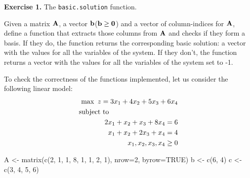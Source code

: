 \documentclass[
]{article}
\newenvironment{Shaded}{\begin{snugshade}}{\end{snugshade}}
\newcommand{\AttributeTok}[1]{\textcolor[rgb]{0.77,0.63,0.00}{#1}}
\newcommand{\ConstantTok}[1]{\textcolor[rgb]{0.00,0.00,0.00}{#1}}
\newcommand{\DecValTok}[1]{\textcolor[rgb]{0.00,0.00,0.81}{#1}}
\newcommand{\FunctionTok}[1]{\textcolor[rgb]{0.00,0.00,0.00}{#1}}
\newcommand{\NormalTok}[1]{#1}
\newcommand{\OtherTok}[1]{\textcolor[rgb]{0.56,0.35,0.01}{#1}}
\begin{document}
\textbf{Exercise 1.} The \texttt{basic.solution} function.

Given a matrix \({\bf A}\), a vector
\({\bf b}\)(\({\bf b}\geq {\bf 0}\)) and a vector of column-indices for
\({\bf A}\), define a function that extracts those columns from
\({\bf A}\) and checks if they form a basis. If they do, the function
returns the corresponding basic solution: a vector with the values for
all the variables of the system. If they don't, the function returns a
vector with the values for all the variables of the system set to -1.

To check the correctness of the functions implemented, let us consider
the following linear model: \vspace{-0.5cm} \begin{eqnarray*}
\max\ z=3x_{1}+4x_{2}+5x_3+6x_4 \\
\mbox{subject to}\hspace{3.5cm}\\
2x_{1}+x_{2}+x_3+8x_4 = 6    \\
x_{1}+x_{2}+2x_3+x_{4}=4 \\
x_{1},x_{2},x_{3},x_{4}\geq 0  \\
\end{eqnarray*}

\vspace{-0.5cm}

\begin{Shaded}
\begin{Highlighting}[]
\NormalTok{A }\OtherTok{\textless{}{-}} \FunctionTok{matrix}\NormalTok{(}\FunctionTok{c}\NormalTok{(}\DecValTok{2}\NormalTok{, }\DecValTok{1}\NormalTok{, }\DecValTok{1}\NormalTok{, }\DecValTok{8}\NormalTok{, }\DecValTok{1}\NormalTok{, }\DecValTok{1}\NormalTok{, }\DecValTok{2}\NormalTok{, }\DecValTok{1}\NormalTok{), }\AttributeTok{nrow=}\DecValTok{2}\NormalTok{, }\AttributeTok{byrow=}\ConstantTok{TRUE}\NormalTok{)}
\NormalTok{b }\OtherTok{\textless{}{-}} \FunctionTok{c}\NormalTok{(}\DecValTok{6}\NormalTok{, }\DecValTok{4}\NormalTok{)}
\NormalTok{c }\OtherTok{\textless{}{-}} \FunctionTok{c}\NormalTok{(}\DecValTok{3}\NormalTok{, }\DecValTok{4}\NormalTok{, }\DecValTok{5}\NormalTok{, }\DecValTok{6}\NormalTok{)}
\end{Highlighting}
\end{Shaded}
\end{document}
